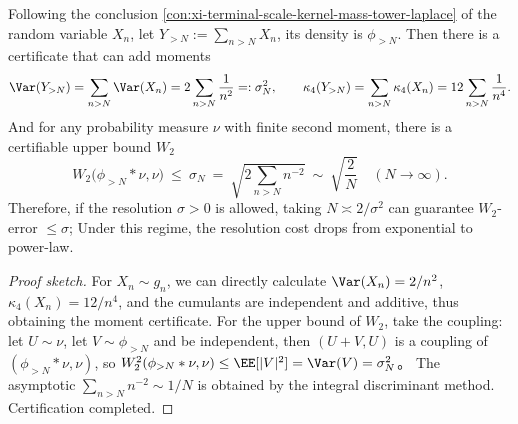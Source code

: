 \begin{conclusion}\label{con:xi-terminal-scale-kernel-tail-moments-w2}
Following the conclusion \ref{con:xi-terminal-scale-kernel-mass-tower-laplace} of the random variable \(X_n\), let \(Y_{>N}:=\sum_{n>N}X_n\), its density is \(\phi_{>N}\).
Then there is a certificate that can add moments
\[
\Var(Y_{>N})=\sum_{n>N}\Var(X_n)=2\sum_{n>N}\frac{1}{n^2}=: \sigma_N^2,
\qquad
\kappa_4(Y_{>N})=\sum_{n>N}\kappa_4(X_n)=12\sum_{n>N}\frac{1}{n^4}.
\]
And for any probability measure \(\nu\) with finite second moment, there is a certifiable upper bound \(W_2\)
\[
\boxed{\;
W_2\bigl(\phi_{>N}*\nu,\nu\bigr)\ \le\ \sigma_N
\ =\ \sqrt{2\sum_{n>N}n^{-2}}
\ \sim\ \sqrt{\frac{2}{N}}\quad(N\to\infty).\;}
\]
Therefore, if the resolution \(\sigma>0\) is allowed, taking \(N\asymp 2/\sigma^{2}\) can guarantee \(W_2\)-error \(\le \sigma\);
Under this regime, the resolution cost drops from exponential to power-law.
\end{conclusion}
\begin{proof}[Proof sketch]
For \(X_n\sim g_n\), we can directly calculate \(\Var(X_n)=2/n^2\), \(\kappa_4(X_n)=12/n^4\), and the cumulants are independent and additive, thus obtaining the moment certificate.
For the upper bound of \(W_2\), take the coupling: let \(U\sim \nu\), let \(V\sim \phi_{>N}\) and be independent, then \((U+V,U)\) is a coupling of \((\phi_{>N}*\nu,\nu)\), so
\(
W_2^2(\phi_{>N}*\nu,\nu)\le \EE[|V|^2]=\Var(V)=\sigma_N^2
\)。
The asymptotic \(\sum_{n>N}n^{-2}\sim 1/N\) is obtained by the integral discriminant method. Certification completed.
\end{proof}

